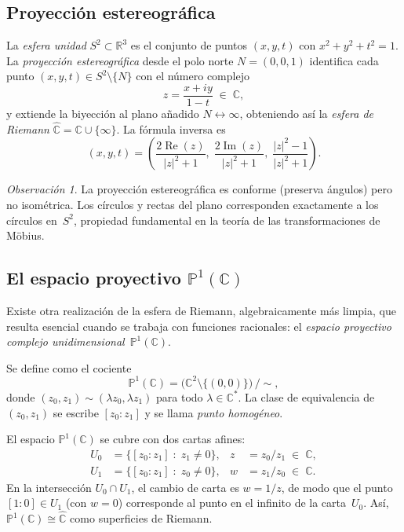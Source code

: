 \documentclass[11pt,a4paper]{article}
\theoremstyle{plain}
\theoremstyle{definition}
\theoremstyle{remark}
\newtheorem{observacion}[teorema]{Observación}
\newcommand{\C}{\mathbb{C}}
\newcommand{\R}{\mathbb{R}}
\newcommand{\Puno}{\mathbb{P}^1(\mathbb{C})}
\begin{document}
\subsection{Proyección estereográfica}

La \emph{esfera unidad} $S^2\subset\R^3$ es el conjunto de puntos
$(x,y,t)$ con $x^2+y^2+t^2=1$.
La \emph{proyección estereográfica} desde el polo norte $N=(0,0,1)$
identifica cada punto $(x,y,t)\in S^2\setminus\{N\}$ con el número
complejo
\[
  z = \frac{x+iy}{1-t}\;\in\;\C,
\]
y extiende la biyección al plano añadido $N\leftrightarrow\infty$,
obteniendo así la \emph{esfera de Riemann} $\hat{\C}=\C\cup\{\infty\}$.
La fórmula inversa es
\[
   (x,y,t) = \left(\frac{2\operatorname{Re}(z)}{|z|^2+1},\;
                    \frac{2\operatorname{Im}(z)}{|z|^2+1},\;
                    \frac{|z|^2-1}{|z|^2+1}\right).
\]

\begin{observacion}
La proyección estereográfica es conforme (preserva ángulos) pero no
isométrica.
Los círculos y rectas del plano corresponden exactamente a los
círculos en~$S^2$, propiedad fundamental en la teoría de las
transformaciones de Möbius.
\end{observacion}

\subsection{El espacio proyectivo \texorpdfstring{$\Puno$}{P1(C)}}

Existe otra realización de la esfera de Riemann, algebraicamente más
limpia, que resulta esencial cuando se trabaja con funciones racionales:
el \emph{espacio proyectivo complejo unidimensional}~$\Puno$.

Se define como el cociente
\[
  \Puno = \bigl(\C^2\setminus\{(0,0)\}\bigr)\,\big/\!\sim,
\]
donde $(z_0,z_1)\sim(\lambda z_0,\lambda z_1)$ para todo
$\lambda\in\C^*$.
La clase de equivalencia de $(z_0,z_1)$ se escribe $[z_0:z_1]$ y se
llama \emph{punto homogéneo}.

El espacio $\Puno$ se cubre con dos cartas afines:
\begin{align*}
  U_0 &= \{[z_0:z_1]\;:\;z_1\neq 0\},
  &z &= z_0/z_1\;\in\;\C,\\
  U_1 &= \{[z_0:z_1]\;:\;z_0\neq 0\},
  &w &= z_1/z_0\;\in\;\C.
\end{align*}
En la intersección $U_0\cap U_1$, el cambio de carta es $w=1/z$, de modo
que el punto $[1:0]\in U_1$ (con $w=0$) corresponde al punto en el
infinito de la carta~$U_0$.
Así, $\Puno\cong\hat{\C}$ como superficies de Riemann.
\end{document}
